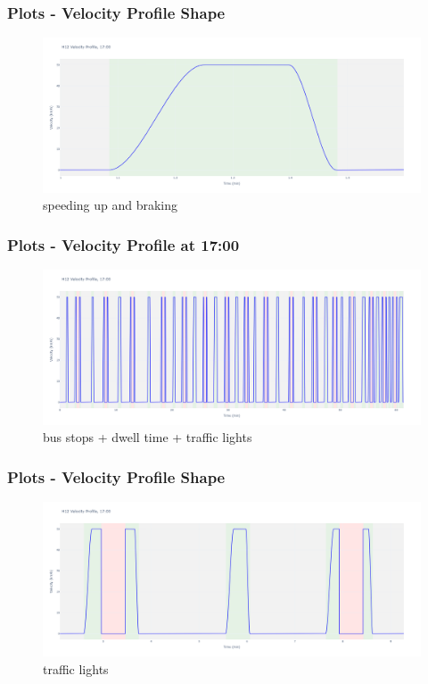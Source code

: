\documentclass[12pt]{beamer}
\begin{document}
\begin{frame}
\frametitle{Plots - Velocity Profile Shape}
\begin{figure}
    \centering
    \includegraphics[width=\textwidth]{plots/vel_profile_1700_shape.png}
    \caption{speeding up and braking}
\end{figure}
\end{frame}

\begin{frame}
\frametitle{Plots - Velocity Profile at 17:00}
\begin{figure}
    \centering
    \includegraphics[width=\textwidth]{plots/vel_profile_1700_lights.png}
    \caption{bus stops + dwell time + traffic lights}
\end{figure}
\end{frame}

\begin{frame}
\frametitle{Plots - Velocity Profile Shape}
\begin{figure}
    \centering
    \includegraphics[width=\textwidth]{plots/vel_profile_1700_shape_lights.png}
    \caption{traffic lights}
\end{figure}
\end{frame}
\end{document}
